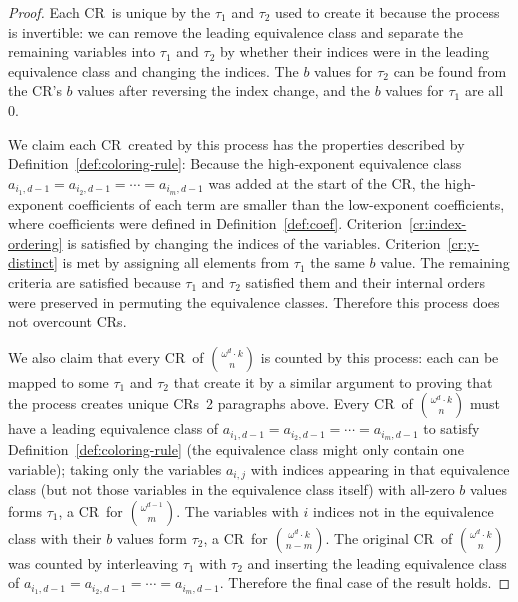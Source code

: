 \documentclass[11pt]{article}
\newcommand{\om}{\omega}
\newcommand{\crulenospace}{CR}
\newcommand{\crule}{\crulenospace~}
\newcommand{\crules}{\crulenospace s~}
\newcommand{\crulesnospace}{\crulenospace s}
\newcommand{\numpoints}{n}
\newcommand{\inumpoints}{i}
\newcommand{\idegr}{j}
\newcommand{\commonconst}{a}
\newcommand{\rareconst}{b}
\theoremstyle{plain}
\theoremstyle{definition}
\begin{document}
\begin{proof}
Each \crule is unique by the $\tau_1$ and $\tau_2$ used to create it because the process is invertible: we can remove the leading equivalence class and separate the remaining variables into $\tau_1$ and $\tau_2$ by whether their indices were in the leading equivalence class and changing the indices. The $\rareconst$ values for $\tau_2$ can be found from the \crulenospace's $\rareconst$ values after reversing the index change, and the $\rareconst$ values for $\tau_1$ are all 0.

We claim each \crule created by this process has the properties described by Definition~\ref{def:coloring-rule}: Because the high-exponent equivalence class $\commonconst_{\inumpoints_1,d-1} = \commonconst_{\inumpoints_2,d-1} = \cdots = \commonconst_{\inumpoints_m,d-1}$ was added at the start of the \crulenospace, the high-exponent coefficients of each term are smaller than the low-exponent coefficients, where coefficients
were defined in Definition~\ref{def:coef}. 
Criterion~\ref{cr:index-ordering} is satisfied by changing the indices of the variables. Criterion~\ref{cr:y-distinct} is met by assigning all elements from $\tau_1$ the same $\rareconst$ value.
The remaining criteria are satisfied because $\tau_1$ and $\tau_2$ satisfied them and their internal orders were preserved in permuting the equivalence classes. Therefore this process does not overcount \crulesnospace.

We also claim that every \crule of $\binom{\om^d\cdot k}{\numpoints}$ is counted by this process: each can be mapped to some $\tau_1$ and $\tau_2$ that create it by a similar argument to proving that the process creates unique \crules 2 paragraphs above. Every \crule of $\binom{\om^d\cdot k}{\numpoints}$ must have a leading equivalence class of $\commonconst_{\inumpoints_1,d-1} = \commonconst_{\inumpoints_2,d-1} = \cdots = \commonconst_{\inumpoints_m,d-1}$ to satisfy Definition~\ref{def:coloring-rule} 
(the equivalence class might only contain one variable); taking only the variables $\commonconst_{\inumpoints,\idegr}$ with indices appearing in that equivalence class (but not those variables in the equivalence class itself) with all-zero $\rareconst$ values forms $\tau_1$, a \crule for $\binom{\om^{d-1}}{m}$. The variables with $\inumpoints$ indices not in the equivalence class with their $\rareconst$ values form $\tau_2$, a \crule for $\binom{\om^d\cdot k}{\numpoints-m}$. The original \crule of $\binom{\om^d \cdot k}{\numpoints}$ was counted by interleaving $\tau_1$ with $\tau_2$ and inserting the leading equivalence class of $\commonconst_{\inumpoints_1,d-1} = \commonconst_{\inumpoints_2,d-1} = \cdots = \commonconst_{\inumpoints_m,d-1}$.
Therefore the final case of the result holds.
\end{proof}
\end{document}
